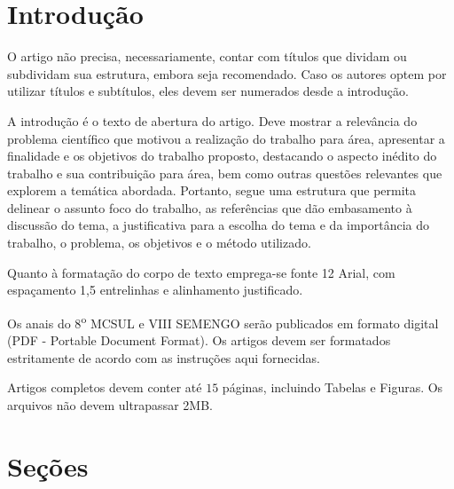 \documentclass[12pt,A4,A4pt]{article}
\begin{document}


\newpage
 \onehalfspacing
\section{Introdução}

 {\fontsize{12pt}{\baselineskip}\selectfont
 
\hspace{0.5cm}O artigo não precisa, necessariamente, contar com títulos que dividam ou subdividam sua estrutura, embora seja recomendado. Caso os autores optem por utilizar títulos e subtítulos, eles devem ser numerados desde a introdução.

A introdução é o texto de abertura do artigo. Deve mostrar a relevância do problema científico que motivou a realização do trabalho para área, apresentar a finalidade e os objetivos do trabalho proposto, destacando o aspecto inédito do trabalho e sua contribuição para área, bem como outras questões relevantes que explorem a temática abordada. Portanto, segue uma estrutura que permita delinear o assunto foco do trabalho, as referências que dão embasamento à discussão do tema, a justificativa para a escolha do tema e da importância do trabalho, o problema, os objetivos e o método utilizado. 

Quanto à formatação do corpo de texto emprega-se fonte 12 Arial, com espaçamento 1,5 entrelinhas e alinhamento justificado. 

Os anais do 8\textsuperscript{o} MCSUL e VIII SEMENGO serão publicados em formato digital (PDF - Portable Document Format). Os artigos devem ser formatados estritamente de acordo com as instruções aqui fornecidas. 

Artigos completos devem conter até $15$ páginas, incluindo Tabelas e Figuras. Os arquivos não devem ultrapassar 2MB.


\section{Seções}
\label{secoes}

}
\end{document}
